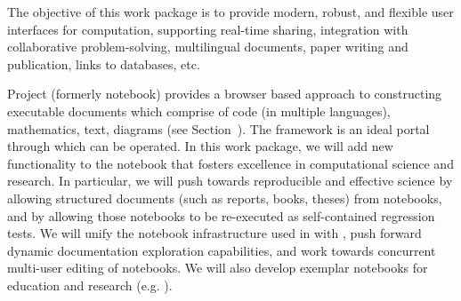 \begin{draft}
\end{draft}

\begin{workpackage}[id=UI,wphases=0-48,swsites,
  title=User Interfaces,
  lead=SR,
  PSRM=26,  %
  UVRM=2,   %
  JURM=12,  %
  USHRM=6, %
  LLRM=12, %
  SARM=18, %
  UKRM=2, %
  UBRM=28,  %
  USORM=16, %
  SRRM=28,
  USRM=4, %
  swsites]    %

\begin{wpobjectives}
  The objective of this work package is to provide modern, robust,
  and flexible user interfaces for computation, supporting real-time
  sharing, integration with collaborative problem-solving,
  multilingual documents, paper writing and publication, links to
  databases, etc.
\end{wpobjectives}

\begin{wpdescription}
  Project \Jupyter (formerly \IPython notebook) provides a browser
  based approach to constructing executable documents which comprise
  of code (in multiple languages), mathematics, text, diagrams (see
  Section~\label{sec:jupyter}). The framework is an ideal portal
  through which \VREs can be operated. In this work package, we will
  add new functionality to the \Jupyter notebook that fosters
  excellence in computational science and research. In particular, we
  will push towards reproducible and effective science by allowing
  structured documents (such as reports, books, theses) from
  notebooks, and by allowing those notebooks to be re-executed as
  self-contained regression tests. We will unify the notebook
  infrastructure used in \Sage with \Jupyter, push forward dynamic
  documentation exploration capabilities, and work towards concurrent
  multi-user editing of notebooks. We will also develop 
  exemplar \Jupyter notebooks for education and research
  (e.g. ).


\end{wpdescription}
\end{workpackage}
